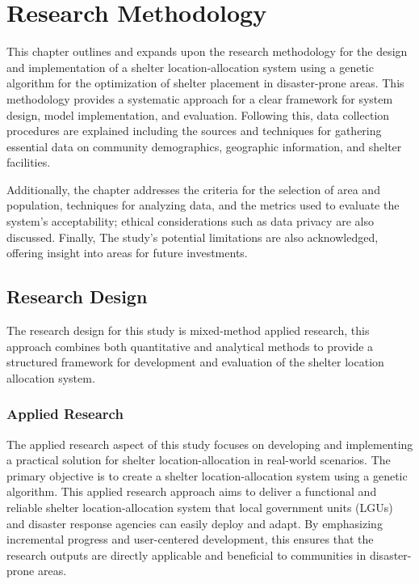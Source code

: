 \chapter{Research Methodology}

	This chapter outlines and expands upon the research methodology for the design and implementation of a shelter location-allocation system using a genetic algorithm for the optimization of shelter placement in disaster-prone areas. This methodology provides a systematic approach for a clear framework for system design, model implementation, and evaluation. Following this, data collection procedures are explained including the sources and techniques for gathering essential data on community demographics, geographic information, and shelter facilities.
	
	Additionally, the chapter addresses the criteria for the selection of area and population, techniques for analyzing data, and the metrics used to evaluate the system’s acceptability; ethical considerations such as data privacy are also discussed. Finally, The study’s potential limitations are also acknowledged, offering insight into areas for future investments.

\section{Research Design}
	The research design for this study is mixed-method applied research, this approach combines both quantitative and analytical methods to provide a structured framework for development and evaluation of the shelter location allocation system.

\subsection{Applied Research}
	The applied research aspect of this study focuses on developing and implementing a practical solution for shelter location-allocation in real-world scenarios. The primary objective is to create a shelter location-allocation system using a genetic algorithm.
	This applied research approach aims to deliver a functional and reliable shelter location-allocation system that local government units (LGUs) and disaster response agencies can easily deploy and adapt. By emphasizing incremental progress and user-centered development, this ensures that the research outputs are directly applicable and beneficial to communities in disaster-prone areas.

